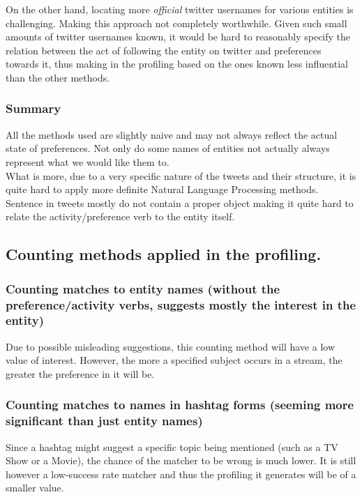 On the other hand, locating more \textit{official} twitter usernames for various entities is challenging. Making this approach not
completely worthwhile. Given such small amounts of twitter usernames known, it would be hard to reasonably specify the
relation between the act of following the entity on twitter and preferences towards it, thus making in the profiling
based on the ones known less influential than the other methods.

\subsubsection{Summary}
All the methods used are slightly naive and may not always reflect the actual
state of preferences. Not only do some names of entities not actually always
represent what we would like them to.
\\ What is more, due to a very specific nature of the
tweets and their structure, it is quite hard to apply more definite Natural Language Processing
methods. Sentence in tweets mostly do not contain a proper object making it quite hard to
relate the activity/preference verb to the entity itself.

\subsection{Counting methods applied in the profiling.}

\subsubsection{Counting matches to entity names (without the preference/activity verbs,
    suggests mostly the interest in the entity)}

Due to possible misleading suggestions, this counting method will have a low value of interest.
However, the more a specified subject occurs in a stream, the greater the preference in it will be.

\subsubsection{Counting matches to names in hashtag forms (seeming more significant than
      just entity names)}

Since a hashtag might suggest a specific topic being mentioned (such as a TV Show or a Movie), the chance
of the matcher to be wrong is much lower. It is still however a low-success rate matcher
and thus the profiling it generates will be of a smaller value.

